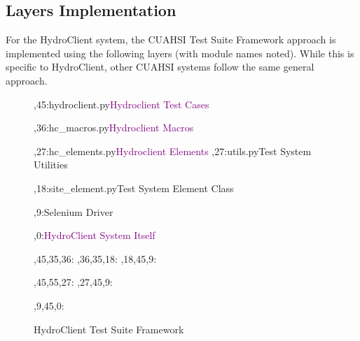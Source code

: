 \documentclass[10pt]{article}
\newcommand{\callemp}{\textcolor{purple}}
\begin{document}
\subsection{Layers Implementation}
For the HydroClient system, the CUAHSI Test Suite Framework approach is implemented using the following layers (with module names noted).  While this is specific to HydroClient, other CUAHSI systems follow the same general approach.
\begin{figure}[H]
\begin{chart}%
  ,45:{hydroclient.py}{\callemp{Hydroclient Test Cases}}{}

  ,36:{hc\_macros.py}{\callemp{Hydroclient Macros}}{}

  ,27:{hc\_elements.py}{\callemp{Hydroclient Elements}}{}
  ,27:{utils.py}{Test System Utilities}{}

  ,18:{site\_element.py}{Test System Element Class}{}

  ,9:{}{Selenium Driver}{}

  ,0:{}{\callemp{HydroClient System Itself}}{}

  ,45,35,36:
  ,36,35,18:
  ,18,45,9:

  ,45,55,27:
  ,27,45,9:

  ,9,45,0:



\end{chart}
\caption{HydroClient Test Suite Framework}
\label{fig:hydTesSuiFra}
\end{figure}
\end{document}
